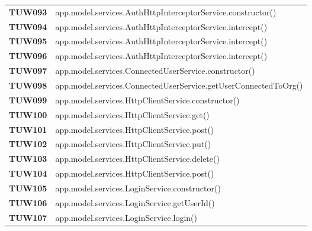 \documentclass[../../piano-di-qualifica.tex]{subfiles}
\begin{document}
\begin{longtable}[H]{>{\centering\bfseries}m{3cm} >{}m{13cm}}

TUW093             & app.model.services.AuthHttpInterceptorService.constructor\@()\\

TUW094             & app.model.services.AuthHttpInterceptorService.intercept\@()\\

TUW095            & app.model.services.AuthHttpInterceptorService.intercept\@()\\

TUW096             & app.model.services.AuthHttpInterceptorService.intercept\@()\\




TUW097             & app.model.services.ConnectedUserService.constructor\@()\\

TUW098             & app.model.services.ConnectedUserService.getUserConnectedToOrg\@()\\



TUW099             & app.model.services.HttpClientService.constructor\@()\\

TUW100              & app.model.services.HttpClientService.get\@()\\

TUW101              & app.model.services.HttpClientService.post\@()\\

TUW102              & app.model.services.HttpClientService.put\@()\\

TUW103              & app.model.services.HttpClientService.delete\@()\\

TUW104              & app.model.services.HttpClientService.post\@()\\




TUW105             & app.model.services.LoginService.constructor\@()\\

TUW106             & app.model.services.LoginService.getUserId\@()\\

TUW107             & app.model.services.LoginService.login\@()\\


\end{longtable}
\end{document}

